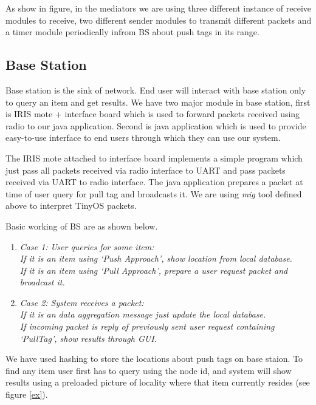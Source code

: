 \documentclass [a4paper,12pt]{book}
\begin{document}
As show in figure, in the mediators we are using three different instance of receive modules to receive, two different sender modules to transmit different packets and a timer module periodically infrom BS about push tags in its range.

\subsection{Base Station}
Base station is the sink of network. End user will interact with base station only to query an item and get results. We have two major module in base station, first is IRIS mote + interface board which is used to forward packets received using radio to our java application. Second is java application which is used to provide easy-to-use interface to end users through which they can use our system. 

The IRIS mote attached to interface board implements a simple program which just pass all packets received via radio interface to UART and pass packets received via UART to radio interface. The java application prepares a packet at time of user query for pull tag and broadcasts it. We are using \emph{mig} tool defined above to interpret TinyOS packets.

Basic working of BS are as shown below.

\begin{framed}
\begin{enumerate}
\item \textit{Case 1: User queries for some item:}\\
\hspace*{1.5em}\textit{If it is an item using `Push Approach', show location from local database.}\\
\hspace*{1.5em}\textit{If it is an item using `Pull Approach', prepare a user request packet and broadcast it.}
\item \textit{Case 2: System receives a packet:}\\
\hspace*{1.5em}\textit{If it is an data aggregation message just update the local database.}\\
\hspace*{1.5em}\textit{If incoming packet is reply of previously sent user request containing `PullTag', show results through GUI.}
\end{enumerate}
\end{framed}

We have used hashing to store the locations about push tags on base staion. To find any item user first has to query using the node id, and system will show results using a preloaded picture of locality where that item currently resides (see figure \ref{ex}).
\end{document}
